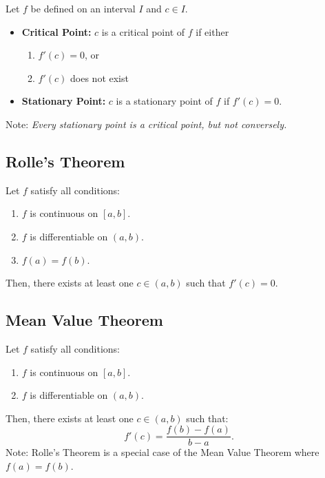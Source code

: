 \documentclass[a4paper,11pt]{article}
\begin{document}
\begin{tcolorbox}
    Let $f$ be defined on an interval $I$ and $c \in I.$
    \begin{itemize}
        \item \textbf{Critical Point:} $c$ is a critical point of $f$ if either
        \begin{enumerate}
            \item $f'(c) = 0$, or
            \item $f'(c)$ does not exist
        \end{enumerate}
        \item \textbf{Stationary Point:} $c$ is a stationary point of $f$ if $f'(c) = 0.$        
    \end{itemize}
    Note: \textit{Every stationary point is a critical point, but not conversely.}
\end{tcolorbox}




\subsection{Rolle's Theorem}

\begin{tcolorbox}
    Let $f$ satisfy all conditions:
    \begin{enumerate}
        \item $f$ is continuous on $[a,b]$.
        \item $f$ is differentiable on $(a,b)$.
        \item $f(a) = f(b)$.
    \end{enumerate}
    Then, there exists at least one $c \in (a,b)$ such that $f'(c) = 0$.
\end{tcolorbox}




\subsection{Mean Value Theorem}

\begin{tcolorbox}
    Let $f$ satisfy all conditions:
    \begin{enumerate}
        \item $f$ is continuous on $[a,b]$.
        \item $f$ is differentiable on $(a,b)$.
    \end{enumerate}
    Then, there exists at least one $c \in (a,b)$ such that:
    \[
    f'(c) = \frac{f(b) - f(a)}{b-a}.
    \]
    Note: Rolle's Theorem is a special case of the Mean Value Theorem where $f(a) = f(b)$.
\end{tcolorbox}
\end{document}
